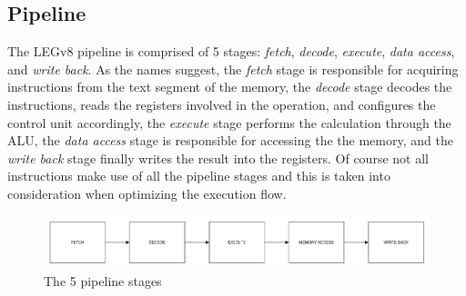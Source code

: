 \subsection*{Pipeline}
The LEGv8 pipeline is comprised of 5 stages: \emph{fetch}, \emph{decode}, \emph{execute}, \emph{data access}, and \emph{write back}.
As the names suggest, the \emph{fetch} stage is responsible for acquiring instructions from the text segment of the memory, the \emph{decode} stage decodes the instructions, reads the registers involved in the operation, and configures the control unit accordingly, the \emph{execute} stage performs the calculation through the ALU, the \emph{data access} stage is responsible for accessing the the memory, and the \emph{write back} stage finally writes the result into the registers.
Of course not all instructions make use of all the pipeline stages and this is taken into consideration when optimizing the execution flow.
\begin{figure}[H]
	\centering
	\includegraphics[width=.8\textwidth]{img/5_stage_pipeline.png}
	\caption{The 5 pipeline stages}
\end{figure}
